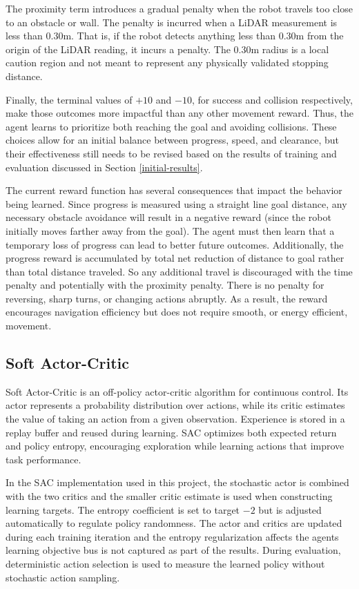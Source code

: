 \documentclass[conference, 11pt]{IEEEtran}
\begin{document}
The proximity term introduces a gradual penalty when the robot travels too close to an obstacle or wall.
The penalty is incurred when a LiDAR measurement is less than $0.30 \mathrm{m}$.
That is, if the robot detects anything less than $0.30 \mathrm{m}$ from the origin of the LiDAR reading, it incurs a penalty. 
The $0.30 \mathrm{m}$ radius is a local caution region and not meant to represent any physically validated stopping distance. 

Finally, the terminal values of $+10$ and $-10$, for success and collision respectively, make those outcomes more impactful than any other movement reward. 
Thus, the agent learns to prioritize both reaching the goal and avoiding collisions. 
These choices allow for an initial balance between progress, speed, and clearance, but their effectiveness still needs to be revised based on the results of training and evaluation discussed in Section \ref{initial-results}. 

The current reward function has several consequences that impact the behavior being learned.
Since progress is measured using a straight line goal distance, any necessary obstacle avoidance will result in a negative reward (since the robot initially moves farther away from the goal). 
The agent must then learn that a temporary loss of progress can lead to better future outcomes. 
Additionally, the progress reward is accumulated by total net reduction of distance to goal rather than total distance traveled. 
So any additional travel is discouraged with the time penalty and potentially with the proximity penalty. 
There is no penalty for reversing, sharp turns, or changing actions abruptly.
As a result, the reward encourages navigation efficiency but does not require smooth, or energy efficient, movement. 

\subsection{Soft Actor-Critic}

Soft Actor-Critic is an off-policy actor-critic algorithm for continuous control. Its actor represents a probability distribution over actions, while its critic estimates the value of taking an action from a given observation. 
Experience is stored in a replay buffer and reused during learning. 
SAC optimizes both expected return and policy entropy, encouraging exploration while learning actions that improve task performance. 

In the SAC implementation used in this project, the stochastic actor is combined with the two critics and the smaller critic estimate is used when constructing learning targets.
The entropy coefficient is set to target $-2$ but is adjusted automatically to regulate policy randomness. 
The actor and critics are updated during each training iteration and the entropy regularization affects the agents learning objective bus is not captured as part of the results. 
During evaluation, deterministic action selection is used to measure the learned policy without stochastic action sampling. \cite{haarnojaSAC_Applications}
\end{document}
